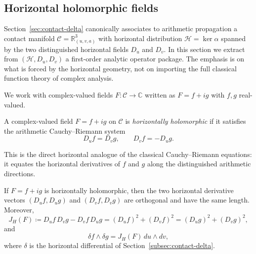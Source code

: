 
\subsection{Horizontal holomorphic fields}\label{subsec:analytic-horizontal-holomorphic}

Section~\ref{sec:contact-delta} canonically associates to arithmetic propagation a contact manifold $\mathcal{C}=\mathbb{R}^3_{(u,v,a)}$ with horizontal distribution $\mathcal{H}=\ker\alpha$ spanned by the two distinguished horizontal fields $D_u$ and $D_v$. In this section we extract from $(\mathcal{H},D_u,D_v)$ a first-order analytic operator package. The emphasis is on what is forced by the horizontal geometry, not on importing the full classical function theory of complex analysis.

We work with complex-valued fields $F:\mathcal{C}\to\mathbb{C}$ written as $F=f+ig$ with $f,g$ real-valued.

\begin{definition}\label{def:horizontal-holomorphic}
A complex-valued field $F=f+ig$ on $\mathcal{C}$ is \emph{horizontally holomorphic} if it satisfies the arithmetic Cauchy--Riemann system
\begin{equation}\label{eq:analytic-cr}
D_u f=D_v g,
\qquad
D_v f=-D_u g.
\end{equation}
\end{definition}

This is the direct horizontal analogue of the classical Cauchy--Riemann equations: it equates the horizontal derivatives of $f$ and $g$ along the distinguished arithmetic directions.

\begin{lemma}\label{lemma:analytic-horizontal-conformal}
If $F=f+ig$ is horizontally holomorphic, then the two horizontal derivative vectors $(D_u f,D_u g)$ and $(D_v f,D_v g)$ are orthogonal and have the same length. Moreover,
\begin{equation}\label{eq:analytic-jacobian}
J_H(F)\coloneqq D_u f\,D_v g-D_v f\,D_u g
=(D_u f)^2+(D_v f)^2=(D_u g)^2+(D_v g)^2,
\end{equation}
and
\[
\delta f\wedge \delta g=J_H(F)\,du\wedge dv,
\]
where $\delta$ is the horizontal differential of Section~\ref{subsec:contact-delta}.
\end{lemma}

